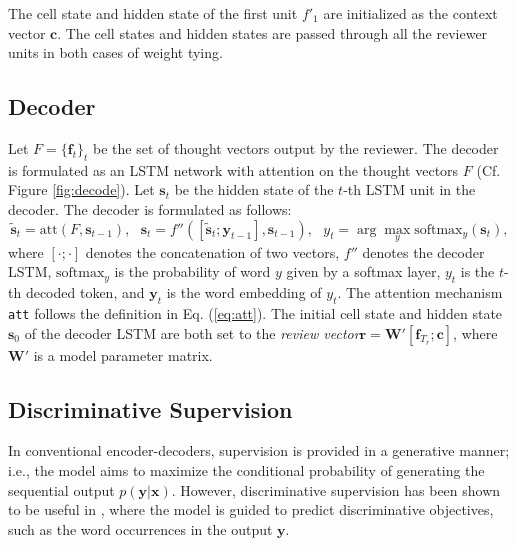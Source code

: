\documentclass{article}
\begin{document}
The cell state and hidden state of the first unit $f'_1$ are initialized as the context vector $\mathbf{c}$. The cell states and hidden states are passed through all the reviewer units in both cases of weight tying.

\subsection{Decoder}

Let $F = \{\mathbf{f}_t\}_t$ be the set of thought vectors output by the reviewer. The decoder is formulated as an LSTM network with attention on the thought vectors $F$ (Cf. Figure \ref{fig:decode}). Let $\mathbf{s}_t$ be the hidden state of the $t$-th LSTM unit in the decoder. The decoder is formulated as follows:
\begin{equation}
\tilde{\mathbf{s}}_t = \mbox{att}(F, \mathbf{s}_{t - 1}), ~~~ \mathbf{s}_t = f''([\tilde{\mathbf{s}}_t; \mathbf{y}_{t - 1}], \mathbf{s}_{t - 1}), ~~~ y_t = \arg \max_y \mbox{softmax}_y(\mathbf{s}_t),
\label{eq:loss}
\end{equation}
where $[\cdot; \cdot]$ denotes the concatenation of two vectors, $f''$ denotes the decoder LSTM, $\mbox{softmax}_y$ is the probability of word $y$ given by a softmax layer, $y_t$ is the $t$-th decoded token, and $\mathbf{y}_t$ is the word embedding of $y_t$. The attention mechanism \texttt{att} follows the definition in Eq. (\ref{eq:att}). The initial cell state and hidden state $\mathbf{s}_0$ of the decoder LSTM are both set to the \textit{review vector}$\mathbf{r} = \mathbf{W}'[\mathbf{f}_{T_r}; \mathbf{c}]$, where $\mathbf{W}'$ is a model parameter matrix.

\subsection{Discriminative Supervision}

In conventional encoder-decoders, supervision is provided in a generative manner; i.e., the model aims to maximize the conditional probability of generating the sequential output $p(\mathbf{y} | \mathbf{x})$. However, discriminative supervision has been shown to be useful in \cite{fang2015captions}, where the model is guided to predict discriminative objectives, such as the word occurrences in the output $\mathbf{y}$.
\end{document}
